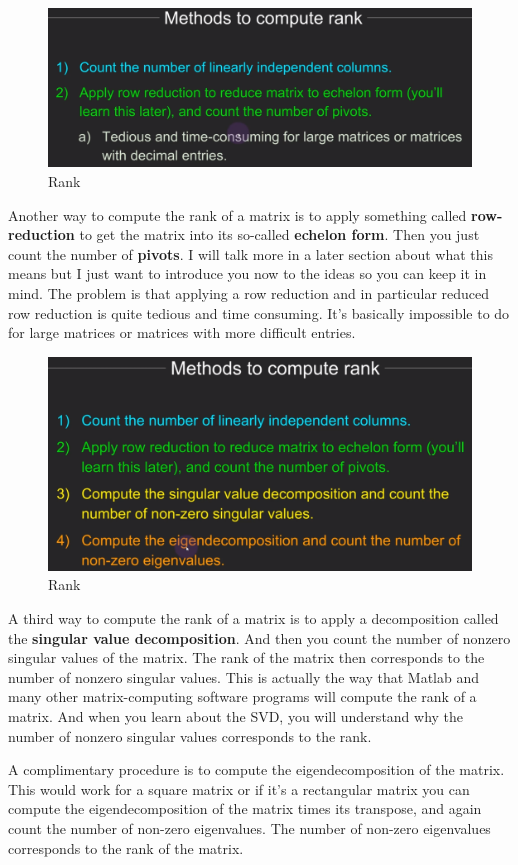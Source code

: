\documentclass[fleqn,10pt]{olplainarticle}
\theoremstyle{definition}
\theoremstyle{remark}
\begin{document}
\begin{figure}[ht]
	\centering
	\includegraphics[width=0.4\linewidth]{images/rank-14.png}
	\caption{Rank}
	\label{fig:rank_14}
\end{figure}

Another way to compute the rank of a matrix is to apply something called \textbf{row-reduction} to get the matrix into its so-called \textbf{echelon form}. Then you just count the number of \textbf{pivots}. I will talk more in a later section about what this means but I just want to introduce you now to the ideas so you can keep it in mind. The problem is that applying a row reduction and in particular reduced row reduction is quite tedious and time consuming. It's basically impossible to do for large matrices or matrices with more difficult entries.

\begin{figure}[ht]
	\centering
	\includegraphics[width=0.5\linewidth]{images/rank-15.png}
	\caption{Rank}
	\label{fig:rank_15}
\end{figure}

A third way to compute the rank of a matrix is to apply a decomposition called the \textbf{singular value decomposition}. And then you count the number of nonzero singular values of the matrix. The rank of the matrix then corresponds to the number of nonzero singular values. This is actually the way that Matlab and many other matrix-computing software programs will compute the rank of a matrix. And when you learn about the SVD, you will understand why the number of nonzero singular values corresponds to the rank.

A complimentary procedure is to compute the eigendecomposition of the matrix. This would work for a square matrix or if it's a rectangular matrix you can compute the eigendecomposition of the matrix times its transpose, and again count the number of non-zero eigenvalues. The number of non-zero eigenvalues corresponds to the rank of the matrix.
\end{document}
